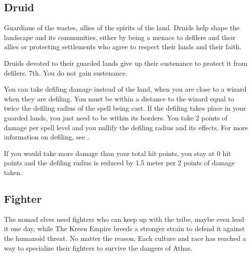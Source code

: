 \subsection{Druid}
Guardians of the wastes, allies of the spirits of the land. Druids help shape the landscape and its communities, either by being a menace to defilers and their allies or protecting settlements who agree to respect their lands and their faith.

{Druids devoted to their guarded lands give up their sustenance to protect it from defilers.}
{}
{7th.}
{You do not gain sustenance.}
{
	You can take defiling damage instead of the land, when you are close to a wizard when they are defiling. You must be within a distance to the wizard equal to twice the defiling radius of the spell being cast. If the defiling takes place in your guarded lands, you just need to be within its borders. You take 2 points of damage per spell level and you nullify the defiling radius and its effects. For more information on defiling, see .

	If you would take more damage than your total hit points, you stay at 0 hit points and the defiling radius is reduced by 1.5 meter per 2 points of damage taken.
}


\subsection{Fighter}
The nomad elves need fighters who can keep up with the tribe, maybe even lead it one day, while The Kreen Empire breeds a stronger strain to defend it against the humanoid threat. No matter the reason, Each culture and race has reached a way to specialize their fighters to survive the dangers of Athas.

